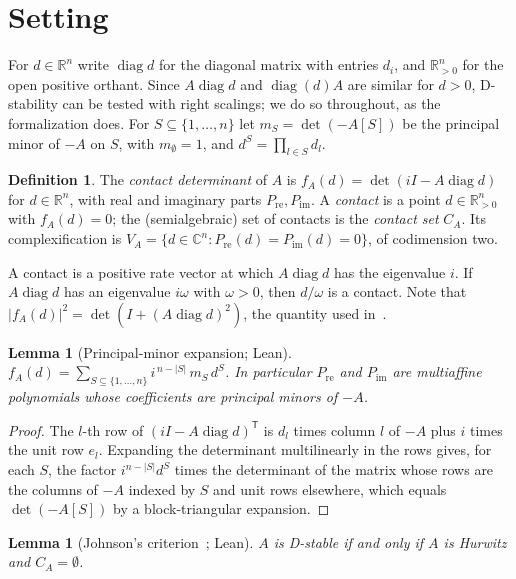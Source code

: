 \documentclass[11pt,a4paper]{article}
\theoremstyle{plain}
\newtheorem{lemma}[theorem]{Lemma}
\theoremstyle{definition}
\newtheorem{definition}[theorem]{Definition}
\newcommand{\R}{\mathbb{R}}
\newcommand{\C}{\mathbb{C}}
\newcommand{\Rp}{\R^n_{>0}}
\newcommand{\diag}{\operatorname{diag}}
\newcommand{\Pre}{P_{\mathrm{re}}}
\newcommand{\Pim}{P_{\mathrm{im}}}
\begin{document}
\section{Setting}\label{sec:setting}

For $d\in\R^n$ write $\diag d$ for the diagonal matrix with entries $d_i$, and $\Rp$ for the open positive
orthant. Since $A\diag d$ and $\diag(d)A$ are similar for $d>0$, D-stability can be tested with right scalings;
we do so throughout, as the formalization does. For $S\subseteq\{1,\dots,n\}$ let $m_S=\det(-A[S])$ be the
principal minor of $-A$ on $S$, with $m_\emptyset=1$, and $d^S=\prod_{l\in S}d_l$.

\begin{definition}\label{def:contact}
The \emph{contact determinant} of $A$ is $f_A(d)=\det(iI-A\diag d)$ for $d\in\R^n$, with real and imaginary
parts $\Pre,\Pim$. A \emph{contact} is a point $d\in\Rp$ with $f_A(d)=0$; the (semialgebraic) set of contacts is
the \emph{contact set} $C_A$. Its complexification is $V_A=\{d\in\C^n:\Pre(d)=\Pim(d)=0\}$, of codimension two.
\end{definition}

A contact is a positive rate vector at which $A\diag d$ has the eigenvalue $i$. If $A\diag d$ has an
eigenvalue $i\omega$ with $\omega>0$, then $d/\omega$ is a contact. Note that $|f_A(d)|^2=\det(I+(A\diag d)^2)$, the
quantity used in~\cite{Hartfiel1980,Abed1986}.

\begin{lemma}[Principal-minor expansion; Lean]\label{lem:expansion}
$f_A(d)=\sum_{S\subseteq\{1,\dots,n\}} i^{\,n-|S|}\,m_S\,d^S$. In particular $\Pre$ and $\Pim$ are multiaffine
polynomials whose coefficients are principal minors of $-A$.
\end{lemma}

\begin{proof}
The $l$-th row of $(iI-A\diag d)^{\mathsf T}$ is $d_l$ times column $l$ of $-A$ plus $i$ times the unit row
$e_l$. Expanding the determinant multilinearly in the rows gives, for each $S$, the factor $i^{n-|S|}d^S$
times the determinant of the matrix whose rows are the columns of $-A$ indexed by $S$ and unit rows
elsewhere, which equals $\det(-A[S])$ by a block-triangular expansion.
\end{proof}

\begin{lemma}[Johnson's criterion~\cite{JohnsonCR1975JME}; Lean]\label{lem:johnson}
$A$ is D-stable if and only if $A$ is Hurwitz and $C_A=\emptyset$.
\end{lemma}
\end{document}
